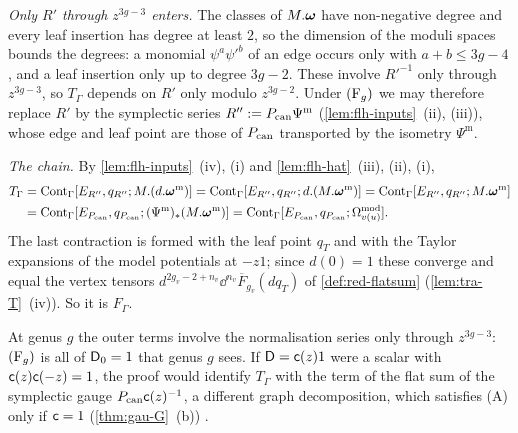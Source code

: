 \begin{sketch}
\emph{Only $R'$ through $z^{3g-3}$ enters.} The classes of $M.\boldsymbol{\omega}$ have non-negative degree and every leaf insertion has degree at least $2$, so the dimension of the moduli spaces bounds the degrees: a monomial $\psi^a\psi'^b$ of an edge occurs only with $a+b\leq3g-4$, and a leaf insertion only up to degree $3g-2$. These involve $R'^{-1}$ only through $z^{3g-3}$, so $T_\Gamma$ depends on $R'$ only modulo $z^{3g-2}$. Under $(\mathrm{F}_{g})$ we may therefore replace $R'$ by the symplectic series $R'':=P_{\mathrm{can}}\Psi^{\mathrm m}$ (\cref{lem:flh-inputs}~(ii), (iii)), whose edge and leaf point are those of $P_{\mathrm{can}}$ transported by the isometry $\Psi^{\mathrm m}$.

\emph{The chain.} By \cref{lem:flh-inputs}~(iv), (i) and \cref{lem:flh-hat}~(iii), (ii), (i),
\begin{align*}
T_\Gamma&=\mathrm{Cont}_\Gamma[E_{R''},q_{R''};M.(d.\boldsymbol{\omega}^{\mathrm m})]=\mathrm{Cont}_\Gamma[E_{R''},q_{R''};d.(M.\boldsymbol{\omega}^{\mathrm m})]=\mathrm{Cont}_\Gamma[E_{R''},q_{R''};M.\boldsymbol{\omega}^{\mathrm m}]\\
&=\mathrm{Cont}_\Gamma[E_{P_{\mathrm{can}}},q_{P_{\mathrm{can}}};(\Psi^{\mathrm m})_*(M.\boldsymbol{\omega}^{\mathrm m})]=\mathrm{Cont}_\Gamma[E_{P_{\mathrm{can}}},q_{P_{\mathrm{can}}};\Omega^{\mathrm{mod}}_{v(u)}] .
\end{align*}
The last contraction is formed with the leaf point $q_T$ and with the Taylor expansions of the model potentials at $-z1$; since $d(0)=1$ these converge and equal the vertex tensors $d^{2g_v-2+n_v}\dd^{n_v}\overline F_{g_v}(dq_T)$ of \cref{def:red-flatsum} (\cref{lem:tra-T}~(iv)). So it is $F_\Gamma$.
\end{sketch}

At genus $g$ the outer terms involve the normalisation series only through $z^{3g-3}$: $(\mathrm{F}_{g})$ is all of $\mathsf{D}_0=1$ that genus $g$ sees. If $\mathsf{D}=\mathsf{c}(z)1$ were a scalar with $\mathsf{c}(z)\mathsf{c}(-z)=1$, the proof would identify $T_\Gamma$ with the term of the flat sum of the symplectic gauge $P_{\mathrm{can}}\mathsf{c}(z)^{-1}$, a different graph decomposition, which satisfies (A) only if $\mathsf{c}=1$ (\cref{thm:gau-G}~(b)) .
